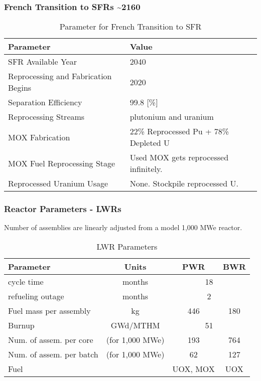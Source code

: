 \begin{frame}
    \frametitle{French Transition to SFRs \textasciitilde 2160}
    
\begin{table}[h]
    \centering
    \begin{tabularx}{\textwidth}{bb}
        \hline
        Parameter & Value \\
        \hline
        \gls{SFR} Available Year & 2040 \\
        Reprocessing and Fabrication Begins & 2020 \\
        Separation Efficiency & 99.8 [\%] \\
        Reprocessing Streams & plutonium and uranium \\
        \gls{MOX} Fabrication &  \small{22\% Reprocessed Pu + 78\% Depleted U}  \\
        \gls{MOX} Fuel Reprocessing Stage &  Used \gls{MOX} gets reprocessed infinitely. \\
        Reprocessed Uranium Usage &  None. Stockpile reprocessed U. \\
        \hline
    \end{tabularx}
    \caption {Parameter for French Transition to \gls{SFR}}
    \label{tab:sim_france}
\end{table}

\end{frame}


\begin{frame}
    \frametitle{Reactor Parameters - \glspl{LWR} }
    Number of assemblies are linearly adjusted from a model 1,000 MWe reactor.
    \begin{table}[h]
    \centering
    \begin{tabularx}{\textwidth}{bccc}
        \hline
        Parameter & Units & PWR & BWR \\
        \hline
        cycle time & months & \multicolumn{2}{c}{18}   \\ 
        refueling outage & months & \multicolumn{2}{c}{2}\\
        Fuel mass per assembly & kg & 446 & 180 \\
        Burnup & GWd/MTHM & \multicolumn{2}{c}{51} \\
        \small{Num. of assem. per core} & (for 1,000 MWe) & 193  & 764 \\
        \small{Num. of assem. per batch} & (for 1,000 MWe) & 62 & 127 \\
        Fuel & & \gls{UOX}, \gls{MOX} & \gls{UOX}  \\
        \hline
    \end{tabularx}
    \caption {\gls{LWR} Parameters}
    \label{tab:lwr}
    \end{table}
\end{frame}


